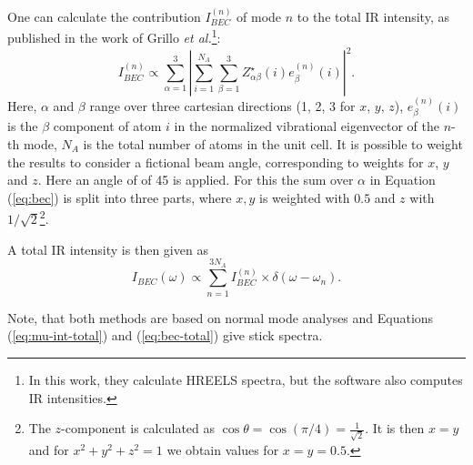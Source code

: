 \documentclass[11pt,DIV=13,BCOR=5mm,a4paper,headinclude]{scrbook}
\begin{document}
\begin{itemize}
One can calculate the contribution $I^{(n)}_{BEC}$\cite{Bruesch1986,Baroni2001} of mode $n$ to the total IR intensity, as published in the work of Grillo \textit{et al.}\cite{BEC}\footnote{In this work, they calculate HREELS spectra, but the software also computes IR intensities.}:
\begin{equation}\label{eq:bec}
  I_{BEC}^{(n)} \propto \sum_{\alpha=1}^3|\sum_{i=1}^{N_A}\sum_{\beta=1}^3 Z_{\alpha\beta}^\star(i)e^{(n)}_\beta(i)|^2.
\end{equation}
Here, $\alpha$ and $\beta$ range over three cartesian directions (1, 2, 3 for $x$, $y$, $z$), $e^{(n)}_\beta(i)$ is the $\beta$ component of atom $i$ in the normalized vibrational eigenvector of the $n$-th mode, $N_A$ is the total number of atoms in the unit cell.
It is possible to weight the results to consider a fictional beam angle, corresponding to weights for $x$, $y$ and $z$.
Here an angle of of 45\textdegree{} is applied.
For this the sum over $\alpha$ in Equation (\ref{eq:bec}) is split into three parts, where $x, y$ is weighted with $0.5$ and $z$ with $1/\sqrt{2}$\footnote{The $z$-component is calculated as $\cos\theta=\cos(\pi/4)=\frac{1}{\sqrt{2}}$. It is then $x=y$ and for $x^2+y^2+z^2=1$ we obtain values for $x=y=0.5$.}.

A total IR intensity is then given as
\begin{equation}\label{eq:bec-total}
 I_{BEC}(\omega)\propto \sum_{n=1}^{3N_A}I_{BEC}^{(n)}\times \delta(\omega - \omega_n).
\end{equation}


\end{itemize}
Note, that both methods are based on normal mode analyses and Equations (\ref{eq:mu-int-total}) and (\ref{eq:bec-total}) give stick spectra.
\end{document}
